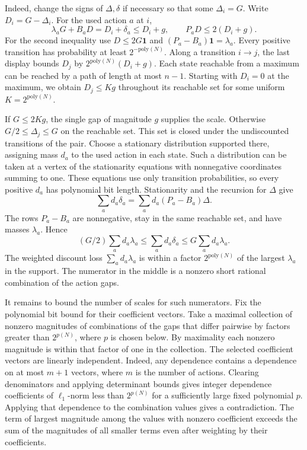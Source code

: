 Indeed, change the signs of \(\Delta,\delta\) if necessary so that
some \(\Delta_i=G\). Write \(D_i=G-\Delta_i\). For the used action
\(a\) at \(i\),
\[
   \lambda_aG+B_aD=D_i+\delta_a\le D_i+g,\qquad
   P_aD\le 2(D_i+g).
\]
For the second inequality use \(D\le2G\mathbf1\) and
\((P_a-B_a)\mathbf1=\lambda_a\). Every positive transition has
probability at least \(2^{-\mathrm{poly}(N)}\). Along a transition
\(i\to j\), the last display bounds \(D_j\) by
\(2^{\mathrm{poly}(N)}(D_i+g)\). Each state reachable from a maximum
can be reached by a path of length at most \(n-1\). Starting with
\(D_i=0\) at the maximum, we obtain \(D_j\le Kg\) throughout its
reachable set for some uniform \(K=2^{\mathrm{poly}(N)}\).

If \(G\le2Kg\), the single gap of magnitude \(g\) supplies the scale.
Otherwise \(G/2\le\Delta_j\le G\) on the reachable set. This set is
closed under the undiscounted transitions of the pair. Choose a
stationary distribution supported there, assigning mass \(d_a\) to the
used action in each state. Such a distribution can be taken at a vertex
of the stationarity equations with nonnegative coordinates summing to
one. These equations use only transition probabilities, so every
positive \(d_a\) has polynomial bit length. Stationarity and the
recursion for \(\Delta\) give
\[
    \sum_a d_a\delta_a=\sum_a d_a(P_a-B_a)\Delta .
\]
The rows \(P_a-B_a\) are nonnegative, stay in the same reachable set,
and have masses \(\lambda_a\). Hence
\[
   (G/2)\sum_a d_a\lambda_a
   \le \sum_a d_a\delta_a\le G\sum_a d_a\lambda_a .
\]
The weighted discount loss \(\sum_a d_a\lambda_a\) is within a factor
\(2^{\mathrm{poly}(N)}\) of the largest \(\lambda_a\) in the support.
The numerator in the middle is a nonzero short rational combination
of the action gaps.

It remains to bound the number of scales for such numerators. Fix the
polynomial bit bound for their coefficient vectors. Take a maximal
collection of nonzero magnitudes of combinations of the gaps that
differ pairwise by factors greater than \(2^{p(N)}\), where \(p\) is
chosen below. By maximality each nonzero magnitude is within that
factor of one in the collection. The selected coefficient vectors are
linearly independent. Indeed, any dependence contains a dependence on
at most \(m+1\) vectors, where \(m\) is the number of actions. Clearing
denominators and applying determinant bounds gives integer dependence
coefficients of \(\ell_1\)-norm less than \(2^{p(N)}\) for a
sufficiently large fixed polynomial \(p\). Applying that dependence to
the combination values gives a contradiction. The term of largest
magnitude among the values with nonzero coefficient exceeds the sum of
the magnitudes of all smaller terms even after weighting by their
coefficients.

